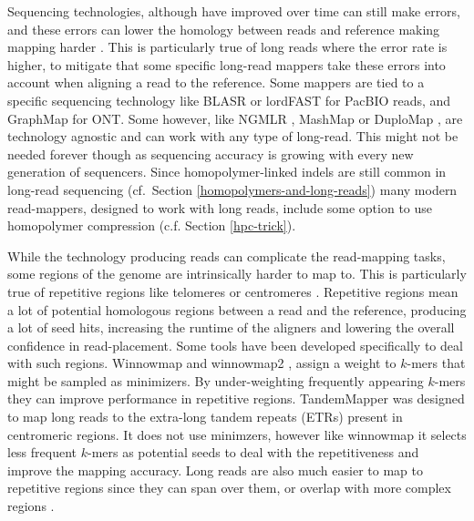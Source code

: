 \documentclass[
  11pt,
  twoside,
  BCOR=10mm,
  listof=totoc]{scrbook}
\begin{document}
Sequencing technologies, although have improved over time can still make errors, and these errors can lower the homology between reads and reference making mapping harder \autocite{gusfieldAlgorithmsStringsTrees1997}. This is particularly true of long reads where the error rate is higher, to mitigate that some specific long-read mappers take these errors into account when aligning a read to the reference. Some mappers are tied to a specific sequencing technology like BLASR \autocite{chaissonMappingSingleMolecule2012} or lordFAST \autocite{haghshenasLordFASTSensitiveFast2019} for PacBIO reads, and GraphMap \autocite{sovicFastSensitiveMapping2016} for ONT. Some however, like NGMLR \autocite{sedlazeckAccurateDetectionComplex2018}, MashMap \autocite{jainFastApproximateAlgorithm2018} or DuploMap \autocite{prodanovSensitiveAlignmentUsing2020}, are technology agnostic and can work with any type of long-read. This might not be needed forever though as sequencing accuracy is growing with every new generation of sequencers. Since homopolymer-linked indels are still common in long-read sequencing (cf.~Section \ref{homopolymers-and-long-reads}) many modern read-mappers, designed to work with long reads, include some option to use homopolymer compression (c.f. Section \ref{hpc-trick}).

While the technology producing reads can complicate the read-mapping tasks, some regions of the genome are intrinsically harder to map to. This is particularly true of repetitive regions like telomeres or centromeres \autocite{alserTechnologyDictatesAlgorithms2021}. Repetitive regions mean a lot of potential homologous regions between a read and the reference, producing a lot of seed hits, increasing the runtime of the aligners and lowering the overall confidence in read-placement. Some tools have been developed specifically to deal with such regions. Winnowmap \autocite{jainWeightedMinimizerSampling2020} and winnowmap2 \autocite{jainLongreadMappingRepetitive2022}, assign a weight to \(k\)-mers that might be sampled as minimizers. By under-weighting frequently appearing \(k\)-mers they can improve performance in repetitive regions. TandemMapper \autocite{mikheenkoTandemToolsMappingLong2020} was designed to map long reads to the extra-long tandem repeats (ETRs) present in centromeric regions. It does not use minimzers, however like winnowmap it selects less frequent \(k\)-mers as potential seeds to deal with the repetitiveness and improve the mapping accuracy. Long reads are also much easier to map to repetitive regions since they can span over them, or overlap with more complex regions \autocite{pollardLongReadsTheir2018,logsdonLongreadHumanGenome2020}.
\end{document}
